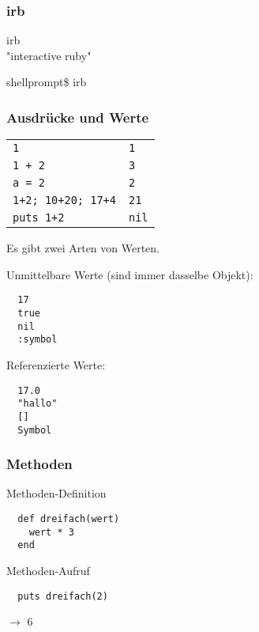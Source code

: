 \begin{frame}[fragile]
  \frametitle{irb}
  \begin{center}
   {\LARGE irb}\\
   
   \bigskip
   "interactive ruby"
   \bigskip
   \bigskip
   \bigskip
   \bigskip
   
  \end{center}
   shellprompt\$ irb

\end{frame}

\begin{frame}[fragile]
  \frametitle{Ausdrücke und Werte}
  \begin{tabular}[t]{l@{\hspace{5em}$\longrightarrow$}l}
    \lstinline|1|       &   \lstinline|1|  \\
    \lstinline|1 + 2|   &   \lstinline|3|  \\
    \lstinline|a = 2|   &   \lstinline|2|  \\
    \lstinline|1+2; 10+20; 17+4|  &   \lstinline|21|  \\
    \lstinline|puts 1+2|   &   \lstinline|nil|  \\
  \end{tabular}
  
  \pause
  Es gibt zwei Arten von Werten.
  
  Unmittelbare Werte (sind immer dasselbe Objekt):
  \begin{lstlisting}
  17
  true
  nil
  :symbol
  \end{lstlisting}
  \pause
  Referenzierte Werte:
  \begin{lstlisting}
  17.0
  "hallo"
  []
  Symbol
  \end{lstlisting}
\end{frame}

\begin{frame}[fragile]
  \frametitle{Methoden}
  Methoden-Definition
  \begin{lstlisting}
  def dreifach(wert)
    wert * 3
  end
  \end{lstlisting}
  \pause
  Methoden-Aufruf
  \begin{lstlisting}
  puts dreifach(2) 
  \end{lstlisting}
  $\longrightarrow$ 6
\end{frame}


